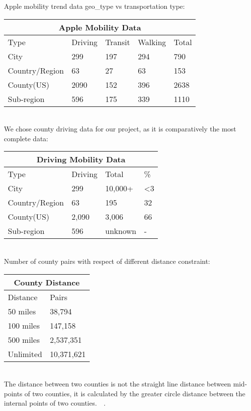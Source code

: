 Apple mobility trend data geo\_type vs transportation type: \\
\begin{tabular}{ |p{2.3cm}||p{1.1cm}|p{1cm}|p{1.2cm}|p{0.7cm}|  }
 \hline
 \multicolumn{5}{|c|}{Apple Mobility Data} \\
 \hline
 Type    & Driving & Transit & Walking & Total\\
 \hline
 City & 299 & 197 & 294 & 790\\
 \hline
 Country/Region & 63 & 27 & 63 & 153\\
 \hline
 County(US) & 2090 & 152 & 396 & 2638\\
 \hline
 Sub-region & 596 & 175 & 339 & 1110\\
 \hline
\end{tabular}\\

We chose county driving data for our project, as it is comparatively the most complete data:  \\
\begin{tabular}{ |p{2.5cm}||p{1.1cm}|p{1.5cm}|p{1cm}|  }
 \hline
 \multicolumn{4}{|c|}{Driving Mobility Data} \\
 \hline
 Type    & Driving & Total & \% \\
 \hline
 City & 299 & 10,000+ & <3\\
 \hline
 Country/Region & 63 & 195 & 32\\
 \hline
 County(US) & 2,090 & 3,006 & 66\\
 \hline
 Sub-region & 596 & unknown & -\\
 \hline
\end{tabular}\\

Number of county pairs with respect of different distance constraint: \\
\begin{tabular}{ |p{3cm}||p{3cm}|  }
 \hline
 \multicolumn{2}{|c|}{County Distance} \\
 \hline
 Distance    & Pairs \\
 \hline
 50 miles & 38,794\\
 \hline
 100 miles & 147,158\\
 \hline
 500 miles & 2,537,351\\
 \hline
 Unlimited & 10,371,621\\
 \hline
\end{tabular}\\

The distance between two counties is not the straight line distance between mid-points of two counties, it is calculated by the greater circle distance between the internal points of two counties.~\cite{nber}~\cite{internalpoint}.\\


